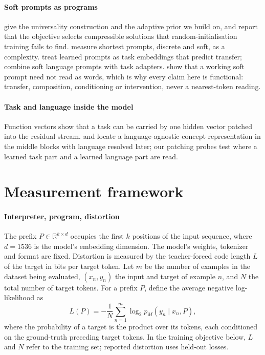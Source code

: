 \documentclass{article}
\begin{document}
\paragraph{Soft prompts as programs}
\citet{shaw2026bridging} give the universality construction and the adaptive prior we build on, and report that the objective selects compressible solutions that random-initialisation training fails to find. \citet{cosma2026prompting} measure shortest prompts, discrete and soft, as a complexity. \citet{vu2022spot} treat learned prompts as task embeddings that predict transfer; \citet{vykopal2025soft} combine soft language prompts with task adapters. \citet{khashabi2022prompt} show that a working soft prompt need not read as words, which is why every claim here is functional: transfer, composition, conditioning or intervention, never a nearest-token reading.

\paragraph{Task and language inside the model}
Function vectors \citep{todd2024function} show that a task can be carried by one hidden vector patched into the residual stream. \citet{wendler2024llamas} and \citet{dumas2025separating} locate a language-agnostic concept representation in the middle blocks with language resolved later; our patching probes test where a learned task part and a learned language part are read.

\section{Measurement framework}\label{sec:framework}

\paragraph{Interpreter, program, distortion}
The prefix $P\in\mathbb R^{k\times d}$ occupies the first $k$ positions of the input sequence, where $d=1536$ is the model's embedding dimension. The model's weights, tokenizer and format are fixed. Distortion is measured by the teacher-forced code length $L$ of the target in bits per target token. Let $m$ be the number of examples in the dataset being evaluated, $(x_n, y_n)$ the input and target of example $n$, and $N$ the total number of target tokens. For a prefix $P$, define the average negative log-likelihood as
\[
L(P) =
-\frac{1}{N}
\sum_{n=1}^{m}
\log_2 p_M(y_n \mid x_n, P),
\]
where the probability of a target is the product over its tokens, each conditioned on the ground-truth preceding target tokens. In the training objective below, $L$ and $N$ refer to the training set; reported distortion uses held-out losses.
\end{document}

